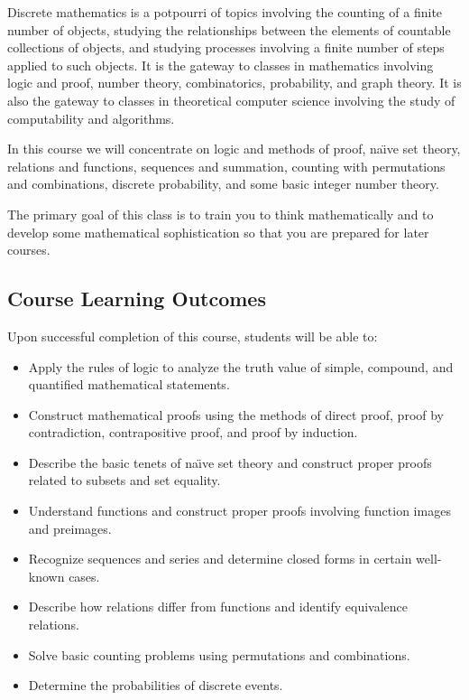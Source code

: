 \documentclass[letterpaper,12pt,fleqn]{article}
\begin{document}
Discrete mathematics is a potpourri of topics involving the counting of a finite number of objects, studying the
relationships between the elements of countable collections of objects, and studying processes involving a finite
number of steps applied to such objects.  It is the gateway to classes in mathematics involving logic and proof,
number theory, combinatorics, probability, and graph theory.  It is also the gateway to classes in theoretical
computer science involving the study of computability and algorithms.

In this course we will concentrate on logic and methods of proof, na\"{\i}ve set theory, relations and functions,
sequences and summation, counting with permutations and combinations, discrete probability, and some basic integer
number theory.

The primary goal of this class is to train you to think mathematically and to develop some mathematical
sophistication so that you are prepared for later courses.

\subsection*{Course Learning Outcomes}

Upon successful completion of this course, students will be able to:
\begin{itemize}
\item Apply the rules of logic to analyze the truth value of simple, compound, and quantified mathematical
  statements.
\item Construct mathematical proofs using the methods of direct proof, proof by contradiction, contrapositive
  proof, and proof by induction.
\item Describe the basic tenets of na\"{\i}ve set theory and construct proper proofs related to subsets and
  set equality.
\item Understand functions and construct proper proofs involving function images and preimages.
\item Recognize sequences and series and determine closed forms in certain well-known cases.
\item Describe how relations differ from functions and identify equivalence relations.
\item Solve basic counting problems using permutations and combinations.
\item Determine the probabilities of discrete events.
\end{itemize}
\end{document}
